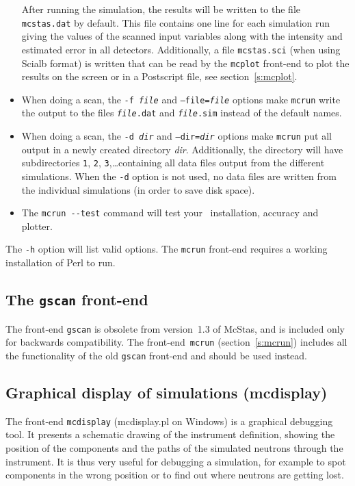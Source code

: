 \begin{itemize}
After running the simulation, the results will be written to the file
\verb+mcstas.dat+ by default. This file contains one line for each
simulation run giving the values of the scanned input variables along
with the intensity and estimated error in all detectors. Additionally, a
file \verb+mcstas.sci+ (when using Scialb format) is written that can be read by the \verb+mcplot+
front-end to plot the results on the screen or in a Postscript file, see
section~\ref{s:mcplot}. 
\item When doing a scan, the \texttt{-f {\it file}} and
  \texttt{--file={\it file}} options make \verb+mcrun+ write the output
  to the files \texttt{{\it file\/}.dat} and \texttt{{\it file\/}.sim}
  instead of the default names.
\item When doing a scan, the \texttt{-d {\it dir}} and
  \texttt{--dir={\it dir}} options make \verb+mcrun+ put all output in a
  newly created directory \textit{dir}. Additionally, the directory will
  have subdirectories \verb+1+, \verb+2+, \verb+3+,\ldots containing all
  data files output from the different simulations. When the \verb+-d+
  option is not used, no data files are written from the individual
  simulations (in order to save disk space).
\item The \verb+mcrun --test+ command will test your \MCS\ installation, accuracy and plotter. 
\end{itemize}

The \verb+-h+ option will list valid options. The \verb+mcrun+ front-end requires a working installation of Perl to run.


\subsection{The \texttt{gscan} front-end}
\label{gscan}

The front-end \verb+gscan+ is obsolete from version~1.3 of McStas, and
is included only for backwards compatibility. The front-end~\verb+mcrun+
(section~\ref{s:mcrun}) includes all the functionality of the old
\verb+gscan+ front-end and should be used instead.


\subsection{Graphical display of simulations (mcdisplay)}
\label{s:mcdisplay}

The front-end \verb+mcdisplay+ (mcdisplay.pl on Windows) is a graphical debugging tool.
It presents a schematic drawing of the instrument
definition, showing the position of the components and the paths of the
simulated neutrons through the instrument. It is thus very useful for
debugging a simulation, for example to spot components in the wrong
position or to find out where neutrons are getting lost.


